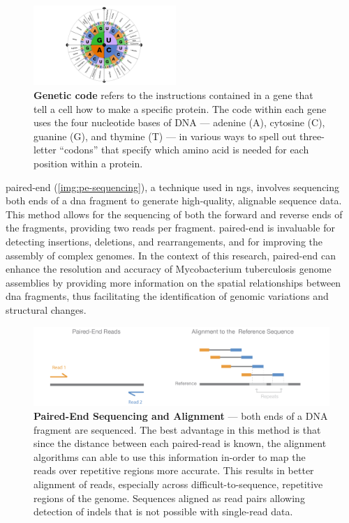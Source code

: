 \begin{figure}  
  \centering
  \includegraphics[width=0.48\textwidth]{resources/images/genetic-code.png} 
  \caption{\textbf{Genetic code}  \cite{NHGRI2024-Code} refers to the instructions contained in a gene that tell a cell how to make a specific protein. The code within each gene uses the four nucleotide bases of DNA — adenine (A), cytosine (C), guanine (G), and thymine (T) — in various ways to spell out three-letter “codons” that specify which amino acid is needed for each position within a protein.}
  \label{img:genetic-code}
\end{figure}

\gls{paired-end} (\autoref{img:pe-sequencing}), a technique used in \gls{ngs}, involves sequencing both ends of a \gls{dna} fragment to generate high-quality, alignable sequence data. This method allows for the \gls{sequencing} of both the forward and reverse ends of the fragments, providing two \gls{read}s per fragment. \gls{paired-end} is invaluable for detecting insertions, deletions, and rearrangements, and for improving the \gls{assembly} of complex \gls{genome}s. In the context of this research, \gls{paired-end} can enhance the resolution and accuracy of Mycobacterium tuberculosis genome assemblies by providing more information on the spatial relationships between \gls{dna} fragments, thus facilitating the identification of genomic variations and structural changes.

\begin{figure}[ht]
  \centering
  \includegraphics[width=\textwidth]{resources/images/paired-end (PE) sequencing.png}
  \caption{\textbf{Paired-End Sequencing and Alignment} \cite{Illumina2017-PE} — both ends of a DNA fragment are sequenced. The best advantage in this method is that since the distance between each paired-read is known, the alignment algorithms can able to use this information in-order to map the reads over repetitive regions more accurate. This results in better alignment of reads, especially across difficult-to-sequence, repetitive regions of the genome. Sequences aligned as read pairs allowing detection of indels that is not possible with single-read data.}
  \label{img:pe-sequencing}
\end{figure}

